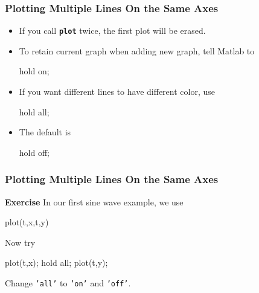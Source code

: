 \documentclass{beamer}  %
\newcommand{\tttbf}[1]{\texttt{\textbf{#1}}} %
\begin{document}
\begin{frame}[fragile]
\frametitle{Plotting Multiple Lines On the Same Axes}
\begin{itemize}[<+->]
    \item If you call \tttbf{plot} twice, the first plot will be erased.
    
    \item To retain current graph when adding new graph, tell Matlab to
          \begin{matlabcode}[frame=none]
          hold on;
          \end{matlabcode}
          
    \item If you want different lines to have different color, use
          \begin{matlabcode}[frame=none]
          hold all;
          \end{matlabcode}
          
    \item The default is
          \begin{matlabcode}[frame=none]
          hold off;
          \end{matlabcode}
\end{itemize}

\end{frame}
\begin{frame}[fragile]
\frametitle{Plotting Multiple Lines On the Same Axes}
\textbf{Exercise}
In our first sine wave example, we use
\begin{matlabcode}[frame=none]
          plot(t,x,t,y)
\end{matlabcode}\pause
          
Now try
\begin{matlabcode}[frame=none]
          plot(t,x);
          hold all;
          plot(t,y);
\end{matlabcode}

Change \texttt{'all'} to \texttt{'on'} and \texttt{'off'}.

\end{frame}
\end{document}
